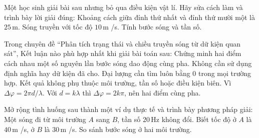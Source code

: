 \begin{ex}
Một học sinh giải bài sau nhưng bỏ qua điều kiện vật lí. Hãy sửa cách làm và trình bày lời giải đúng: Khoảng cách giữa đỉnh thứ nhất và đỉnh thứ mười một là $25\,\text{m}$. Sóng truyền với tốc độ $10\,\text{m}$ /s. Tính bước sóng và tần số.
\choiceTF

\end{ex}

\begin{ex}
Trong chuyên đề “Phân tích trạng thái và chiều truyền sóng từ dữ kiện quan sát”, Kết luận nào phù hợp nhất khi giải bài toán sau: Chứng minh hai điểm cách nhau một số nguyên lần bước sóng dao động cùng pha.
\choice
{Không cần sử dụng định nghĩa hay dữ kiện đã cho.}
{Đại lượng cần tìm luôn bằng 0 trong mọi trường hợp.}
{Kết quả không phụ thuộc môi trường, tần số hoặc điều kiện biên.}
{\True Vì $\Delta\varphi=2\pi d/\lambda$. Với $d=k\lambda$ thì $\Delta\varphi=2k\pi$, nên hai điểm cùng pha.}
\end{ex}

\begin{ex}
Mở rộng tình huống sau thành một ví dụ thực tế và trình bày phương pháp giải: Một sóng đi từ môi trường $A$ sang $B$, tần số $20\,\text{Hz}$ không đổi. Biết tốc độ ở $A$ là $40\,\text{m}$ /s, ở $B$ là $30\,\text{m}$ /s. So sánh bước sóng ở hai môi trường.
\choiceTF

\end{ex}

